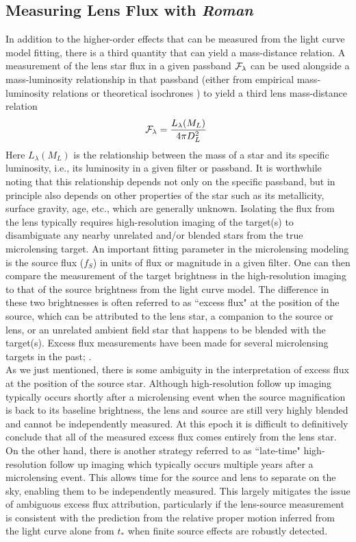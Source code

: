 \documentclass[twocolumn]{aastex631}
\begin{document}
\subsection{Measuring Lens Flux with \textit{Roman}} \label{subsec:lens-flux-description}
In addition to the higher-order effects that can be measured from the light curve model fitting, there is a third quantity that can yield a mass-distance relation. A measurement of the lens star flux in a given passband ${\cal F}_\lambda$ can be used alongside a mass-luminosity relationship in that passband (either from empirical mass-luminosity relations \citep{henry:1993a, kenyon:1995a, henry:1999a, delfosse:2000a} or theoretical isochrones \citep{girardi:2002a, bressan:2012a}) to yield a third lens mass-distance relation
\begin{equation}\label{eq:md-3}
    {\cal F}_\lambda = \frac{L_\lambda(M_L)}{4\pi D_L^2} \ 
\end{equation}
\noindent Here $L_\lambda(M_L)$ is the relationship between the mass of a star and its specific luminosity, i.e., its luminosity in a given filter or passband. It is worthwhile noting that this relationship depends not only on the specific passband, but in principle also depends on other properties of the star such as its metallicity, surface gravity, age, etc., which are generally unknown.  Isolating the flux from the lens typically requires high-resolution imaging of the target(s) to disambiguate any nearby unrelated and/or blended stars from the true microlensing target. An important fitting parameter in the microlensing modeling is the source flux ($f_S$) in units of flux or magnitude in a given filter. One can then compare the measurement of the target brightness in the high-resolution imaging to that of the source brightness from the light curve model. The difference in these two brightnesses is often referred to as ``excess flux" at the position of the source, which can be attributed to the lens star, a companion to the source or lens, or an unrelated ambient field star that happens to be blended with the target(s). Excess flux measurements have been made for several microlensing targets in the past; \cite{bennett:2010b, kubas:2012a, koshimoto:2017b}. \\
\indent As we just mentioned, there is some ambiguity in the interpretation of excess flux at the position of the source star. Although high-resolution follow up imaging typically occurs shortly after a microlensing event when the source magnification is back to its baseline brightness, the lens and source are still very highly blended and cannot be independently measured. At this epoch it is difficult to definitively conclude that all of the measured excess flux comes entirely from the lens star. On the other hand, there is another strategy referred to as ``late-time" high-resolution follow up imaging which typically occurs multiple years after a microlensing event. This allows time for the source and lens to separate on the sky, enabling them to be independently measured. This largely mitigates the issue of ambiguous excess flux attribution, particularly if the lens-source measurement is consistent with the prediction from the relative proper motion inferred from the light curve alone from $t_*$ when finite source effects are robustly detected.\\
\end{document}
